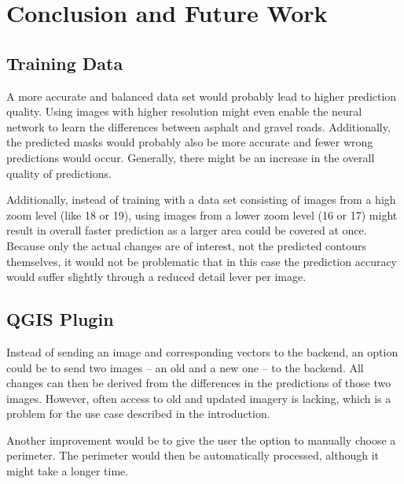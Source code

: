 
\chapter{Conclusion and Future Work}\label{chp:conclusion_and_future_work}

\section{Training Data}
A more accurate and balanced data set would probably lead to higher prediction quality. Using images with higher resolution might even enable the neural network to learn the differences between asphalt and gravel roads. Additionally, the predicted masks would probably also be more accurate and fewer wrong predictions would occur. Generally, there might be an increase in the overall quality of predictions.

Additionally, instead of training with a data set consisting of images from a high zoom level (like 18 or 19), using images from a lower zoom level (16 or 17) might result in overall faster prediction as a larger area could be covered at once. Because only the actual changes are of interest, not the predicted contours themselves, it would not be problematic that in this case the prediction accuracy would suffer slightly through a reduced detail lever per image.


\section{QGIS Plugin}
Instead of sending an image and corresponding vectors to the backend, an option could be to send two images – an old and a new one – to the backend. All changes can then be derived from the differences in the predictions of those two images. However, often access to old and updated imagery is lacking, which is a problem for the use case described in the introduction.

Another improvement would be to give the user the option to manually choose a perimeter. The perimeter would then be automatically processed, although it might take a longer time.